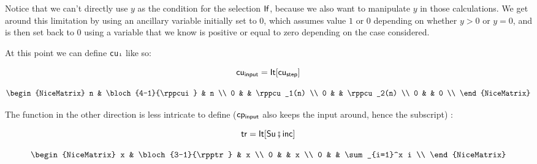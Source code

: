 \documentclass[runningheads]{llncs}
\begin{document}
Notice that we can't directly use $y$ as the condition for the selection $\mathsf{If}$,
because we also want to manipulate $y$ in those calculations.
We get around this limitation by using an ancillary variable initially set to $0$,
which assumes value $1$ or $0$ depending on whether $y>0$ or $y=0$,
and is then set back to $0$ using a variable that we know is positive or equal to zero depending on the case considered.

At this point we can define \lstinline{cuᵢ} like so:

\noindent\begin{minipage}{.5\linewidth}
    \[ \mathsf{cu_{input}} = \mathsf{It}[\mathsf{cu_{step}}] \]
\end{minipage}%
\begin{minipage}{.5\linewidth}
    \[\begin{NiceMatrix}
        n & \bloch{4-1}{\rppcui} & n           \\
        0 &                      & \rppcu_1(n) \\
        0 &                      & \rppcu_2(n) \\
        0 &                      & 0           \\
    \end{NiceMatrix}\]
\end{minipage}

The function in the other direction is less intricate to define ($\mathsf{cp_{input}}$ also keeps the input around, hence the subscript) :

\noindent\begin{minipage}{.5\linewidth}
    \[ \mathsf{tr} = \mathsf{It}[\mathsf{Su} \fatsemi \mathsf{inc}] \]
\end{minipage}%
\begin{minipage}{.5\linewidth}
    \[\begin{NiceMatrix}
        x & \bloch{3-1}{\rpptr} & x \\
        0 &                     & x \\
        0 &                     & \sum_{i=1}^x i \\
    \end{NiceMatrix}\]
\end{minipage}
\end{document}
